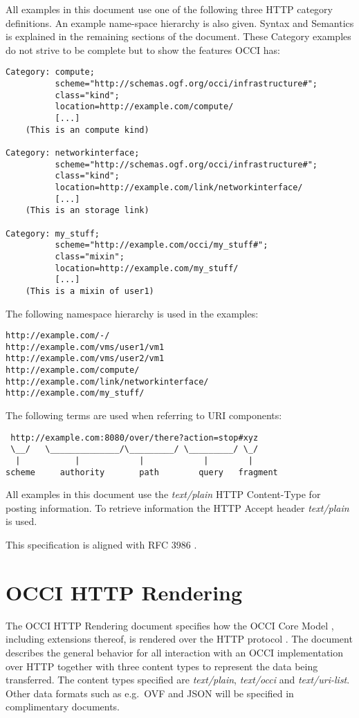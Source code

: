 \documentclass[10pt,a4paper]{article}
\begin{document}
All examples in this document use one of the following three HTTP
category definitions. An example name-space hierarchy is also
given. Syntax and Semantics is explained in the remaining sections of
the document. These Category examples do not strive to be complete but to show
the features OCCI has:

\begin{verbatim}
Category: compute;
          scheme="http://schemas.ogf.org/occi/infrastructure#";
          class="kind";
          location=http://example.com/compute/
          [...]
    (This is an compute kind)

Category: networkinterface;
          scheme="http://schemas.ogf.org/occi/infrastructure#";
          class="kind";
          location=http://example.com/link/networkinterface/
          [...]
    (This is an storage link)

Category: my_stuff;
          scheme="http://example.com/occi/my_stuff#";
          class="mixin";
          location=http://example.com/my_stuff/
          [...]
    (This is a mixin of user1)
\end{verbatim}
The following namespace hierarchy is used in the examples:
\begin{verbatim}
http://example.com/-/
http://example.com/vms/user1/vm1
http://example.com/vms/user2/vm1
http://example.com/compute/
http://example.com/link/networkinterface/
http://example.com/my_stuff/
\end{verbatim}

The following terms \cite{rfc3986} are used when referring to URI
components:

\begin{verbatim}
 http://example.com:8080/over/there?action=stop#xyz
 \__/   \______________/\_________/ \_________/ \_/
  |           |            |            |        |
scheme     authority       path        query   fragment
\end{verbatim}

All examples in this document use the \emph{text/plain} HTTP
Content-Type for posting information. To retrieve information the HTTP
Accept header \emph{text/plain} is used.

This specification is aligned with RFC 3986 \cite{rfc3986}.

\section{OCCI HTTP Rendering}
The OCCI HTTP Rendering document specifies how the OCCI Core Model
\cite{occi:core}, including extensions thereof, is rendered over the
HTTP protocol \cite{rfc2616}. The document describes the general
behavior for all interaction with an OCCI implementation over HTTP
together with three content types to represent the data being
transferred. The content types specified are \textit{text/plain},
\textit{text/occi} and \textit{text/uri-list}. Other data formats such
as e.g.~OVF and JSON will be specified in complimentary documents.
\end{document}
